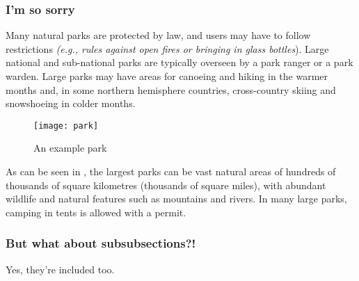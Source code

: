 \documentclass{wluckin_article}
\begin{document}
\subsubsection{I'm so sorry}
Many natural parks are protected by law, and users may have to follow
restrictions \textit{(e.g., rules against open fires or bringing in glass
bottles}). Large national and sub-national parks are typically overseen by a
park ranger or a park warden. Large parks may have areas for canoeing and
hiking in the warmer months and, in some northern hemisphere countries,
cross-country skiing and snowshoeing in colder months.

\begin{figure}[H]
  \centering
  \texttt{[image: park]}
  \caption{An example park}
  \label{fig:park}
\end{figure}

As can be seen in , the largest parks can be
vast natural areas of hundreds of thousands of square kilometres (thousands of
square miles), with abundant wildlife and natural features such as mountains
and rivers. In many large parks, camping in tents is allowed with a permit.

\subsubsection{But what about subsubsections?!}
Yes, they're included too.
\end{document}
